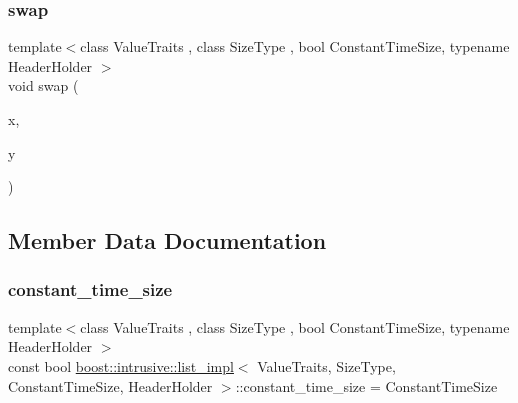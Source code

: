 \subsubsection{\texorpdfstring{swap}{swap}}
{\footnotesize\ttfamily template$<$class Value\+Traits , class Size\+Type , bool Constant\+Time\+Size, typename Header\+Holder $>$ \\
void swap (\begin{DoxyParamCaption}\item[{\hyperlink{classboost_1_1intrusive_1_1list__impl}{list\+\_\+impl}$<$ Value\+Traits, Size\+Type, Constant\+Time\+Size, Header\+Holder $>$ \&}]{x,  }\item[{\hyperlink{classboost_1_1intrusive_1_1list__impl}{list\+\_\+impl}$<$ Value\+Traits, Size\+Type, Constant\+Time\+Size, Header\+Holder $>$ \&}]{y }\end{DoxyParamCaption})\hspace{0.3cm}{\ttfamily [friend]}}



\subsection{Member Data Documentation}
\mbox{\label{classboost_1_1intrusive_1_1list__impl_a874f994ae317f397c2d085b4bd046026}} 
\subsubsection{\texorpdfstring{constant\+\_\+time\+\_\+size}{constant\_time\_size}}
{\footnotesize\ttfamily template$<$class Value\+Traits , class Size\+Type , bool Constant\+Time\+Size, typename Header\+Holder $>$ \\
const bool \hyperlink{classboost_1_1intrusive_1_1list__impl}{boost\+::intrusive\+::list\+\_\+impl}$<$ Value\+Traits, Size\+Type, Constant\+Time\+Size, Header\+Holder $>$\+::constant\+\_\+time\+\_\+size = Constant\+Time\+Size\hspace{0.3cm}{\ttfamily [static]}}

\mbox{\label{classboost_1_1intrusive_1_1list__impl_acfc0b15fa95c54830808600dd25a7472}} 
